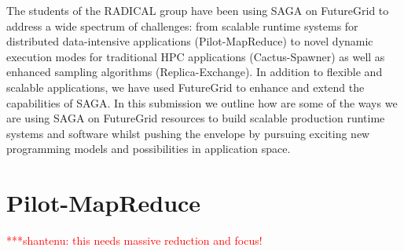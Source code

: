 \documentclass[]{paper}
\newcommand{\jhanote}[1]{ {\textcolor{red} { ***shantenu: #1 }}}
\newcommand{\jhanote}[1]{}
\begin{document}
The students of the RADICAL group have been using SAGA on FutureGrid to address a wide spectrum of challenges: from scalable runtime systems for distributed data-intensive applications (Pilot-MapReduce) to novel dynamic execution modes for traditional HPC applications (Cactus-Spawner) as well as enhanced sampling algorithms (Replica-Exchange).  In addition to flexible and scalable applications, we have used FutureGrid to enhance and extend the capabilities of SAGA.  In this submission we outline how are some of the ways we are using SAGA on FutureGrid resources to build scalable production runtime systems and software whilst pushing the envelope by pursuing exciting new programming models and possibilities in application space.


\section{Pilot-MapReduce}

\jhanote{this needs massive reduction and focus!}



\end{document}
